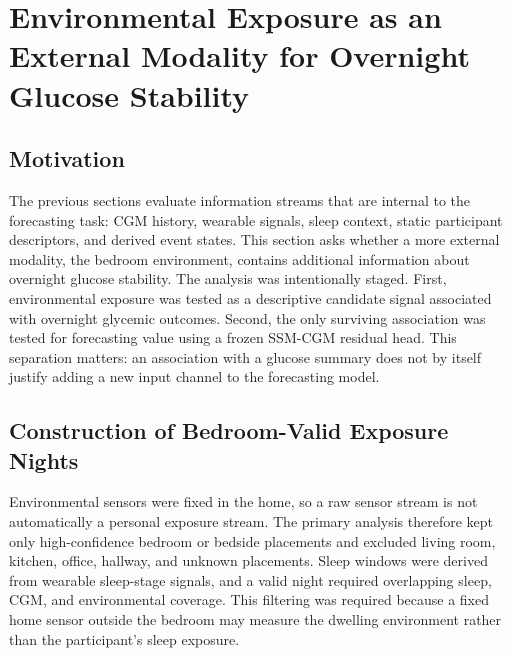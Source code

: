 
\section{Environmental Exposure as an External Modality for Overnight Glucose Stability}
\label{sec:environmental_exposure}

\subsection{Motivation}
\label{subsec:env_motivation}

The previous sections evaluate information streams that are internal to the
forecasting task: CGM history, wearable signals, sleep context, static
participant descriptors, and derived event states. This section asks whether a
more external modality, the bedroom environment, contains additional
information about overnight glucose stability. The analysis was intentionally
staged. First, environmental exposure was tested as a descriptive candidate
signal associated with overnight glycemic outcomes. Second, the only surviving
association was tested for forecasting value using a frozen SSM-CGM residual
head. This separation matters: an association with a glucose summary does not
by itself justify adding a new input channel to the forecasting model.

\subsection{Construction of Bedroom-Valid Exposure Nights}
\label{subsec:env_exposure_nights}

Environmental sensors were fixed in the home, so a raw sensor stream is not
automatically a personal exposure stream. The primary analysis therefore kept
only high-confidence bedroom or bedside placements and excluded living room,
kitchen, office, hallway, and unknown placements. Sleep windows were derived
from wearable sleep-stage signals, and a valid night required overlapping
sleep, CGM, and environmental coverage. This filtering was required because a
fixed home sensor outside the bedroom may measure the dwelling environment
rather than the participant's sleep exposure.

